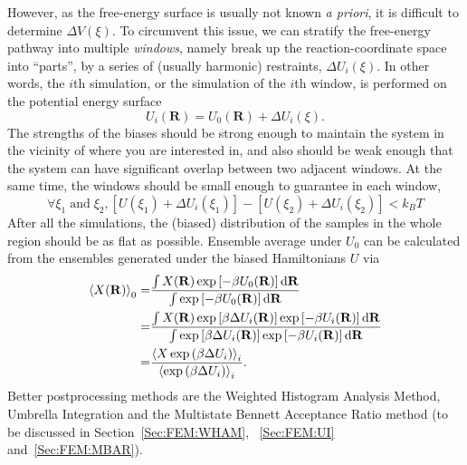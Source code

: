 However, as the free-energy surface is usually not known \textit{a priori}, it is difficult to determine $\Delta V(\xi)$. To circumvent this issue, we can stratify the free-energy pathway into multiple \textit{windows}, namely break up the reaction-coordinate space into ``parts'', by a series of (usually harmonic) restraints, $\Delta U_i(\xi)$. In other words, the $i$th simulation, or the simulation of the $i$th window, is performed on the potential energy surface 
\begin{equation}
	U_i(\mathbf{R})=U_0(\mathbf{R})+\Delta U_i(\xi).
\end{equation}
The strengths of the biases should be strong enough to maintain the system in the vicinity of where you are interested in, and also should be weak enough that the system can have significant overlap between two adjacent windows. At the same time, the windows should be small enough to guarantee in each window,
\begin{equation}
	\forall \xi_{1} \; \mathrm{and} \; \xi_{2}, \left [ U(\xi_{1}) + \Delta U_i(\xi_{1}) \right ]  - \left [ U(\xi_{2}) + \Delta U_i(\xi_{2}) \right ] < k_BT
\end{equation}
After all the simulations, the (biased) distribution of the samples in the whole region should be as flat as possible. Ensemble average under $U_0$ can be calculated from the ensembles generated under the biased Hamiltonians $U$ via
\begin{align}
	\left<X(\mathbf{R})\right>_0=&\frac{\int X(\mathbf{R})\exp{\left[-\beta U_0(\mathbf{R})\right]}\mathop{}\!\mathrm{d}\mathbf{R}}{\int \exp{\left[-\beta U_0(\mathbf{R})\right]}\mathop{}\!\mathrm{d}\mathbf{R}}\notag\\
	                            =&\frac{\int X(\mathbf{R})\exp{\left[\beta \Delta U_i(\mathbf{R})\right]}\exp{\left[-\beta U_i(\mathbf{R})\right]}\mathop{}\!\mathrm{d}\mathbf{R}}{\int \exp{\left[\beta \Delta U_i(\mathbf{R})\right]}\exp{\left[-\beta U_i(\mathbf{R})\right]}\mathop{}\!\mathrm{d}\mathbf{R}}\notag\\
	                =&\frac{\left<X\exp{\left(\beta\Delta U_i\right)}\right>_i}{\left<\exp{\left(\beta\Delta U_i\right)}\right>_i}.
	\label{Eq:ES:US:reweighting}
\end{align}
Better postprocessing methods are the Weighted Histogram Analysis Method, Umbrella Integration and the Multistate Bennett Acceptance Ratio method (to be discussed in Section~\ref{Sec:FEM:WHAM}, ~\ref{Sec:FEM:UI} and~\ref{Sec:FEM:MBAR}).